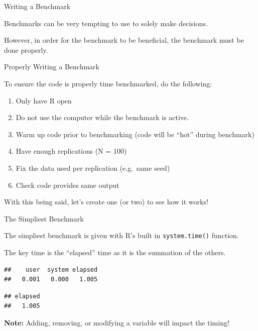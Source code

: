\begin{frame}{Writing a Benchmark}

Benchmarks can be very tempting to use to solely make decisions.

However, in order for the benchmark to be beneficial, the benchmark must
be done properly.

\end{frame}

\begin{frame}{Properly Writing a Benchmark}

To ensure the code is properly time benchmarked, do the following:

\begin{enumerate}
\def\labelenumi{\arabic{enumi}.}
\tightlist
\item
  Only have R open
\item
  Do not use the computer while the benchmark is active.
\item
  Warm up code prior to benchmarking (code will be ``hot'' during
  benchmark)
\item
  Have enough replications (N = 100)
\item
  Fix the data used per replication (e.g.~same seed)
\item
  Check code provides same output
\end{enumerate}

With this being said, let's create one (or two) to see how it works!

\end{frame}

\begin{frame}[fragile]{The Simpliest Benchmark}

The simpliest benchmark is given with R's built in
\texttt{system.time()} function.

The key time is the ``elapsed'' time as it is the summation of the
others.

\begin{Shaded}
\begin{Highlighting}[]
\StringTok{ }\NormalTok{(\{}\NormalTok{(}\NormalTok{)\})}
\end{Highlighting}
\end{Shaded}

\begin{verbatim}
##    user  system elapsed 
##   0.001   0.000   1.005
\end{verbatim}

\begin{Shaded}
\begin{Highlighting}[]
\NormalTok{out[}\NormalTok{]}
\end{Highlighting}
\end{Shaded}

\begin{verbatim}
## elapsed 
##   1.005
\end{verbatim}

\textbf{Note:} Adding, removing, or modifying a variable will impact the
timing!

\end{frame}

